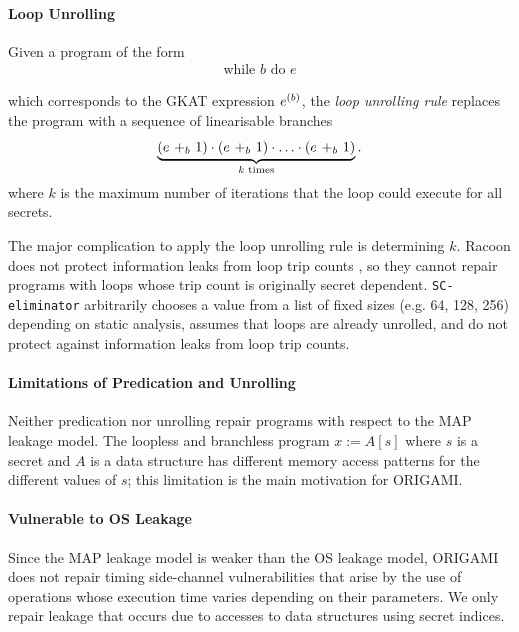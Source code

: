 % 

\paragraph*{Loop Unrolling} Given a program of the form 
\begin{align*}
    \text{while $b$ do $e$}
\end{align*}
    
which corresponds to the GKAT expression $\iteration{b}{e}$, the \emph{loop unrolling rule} replaces the program with a sequence of linearisable branches 
\begin{align*}
    \underbrace{\left(\branch{b}{e}{1}\right)\cdot\left(\branch{b}{e}{1}\right)\cdot\ldots\cdot\left(\branch{b}{e}{1}\right)}_\text{$k$ times}.
    \end{align*}
where $k$ is the maximum number of iterations that the loop could execute for all secrets. 

The major complication to apply the loop unrolling rule is determining $k$. Racoon does not protect information leaks from loop trip counts \cite{Racoon}, so they cannot repair programs with loops whose trip count is originally secret dependent. \texttt{SC-eliminator} arbitrarily chooses a value from a list of fixed sizes (e.g. 64, 128, 256) depending on static analysis, \cite{MSESC} assumes that loops are already unrolled, and \cite{Racoon} do not protect against information leaks from loop trip counts. 

\paragraph*{Limitations of Predication and Unrolling}
Neither predication nor unrolling repair programs with respect to the MAP leakage model. The loopless and branchless program $x:=A[s]$ where $s$ is a secret and $A$ is a data structure has different memory access patterns for the different values of $s$; this limitation is the main motivation for ORIGAMI.

\paragraph*{Vulnerable to OS Leakage} Since the MAP leakage model is weaker than the OS leakage model, ORIGAMI does not repair timing side-channel vulnerabilities that arise by the use of operations whose execution time varies depending on their parameters. We only repair leakage that occurs due to accesses to data structures using secret indices.

